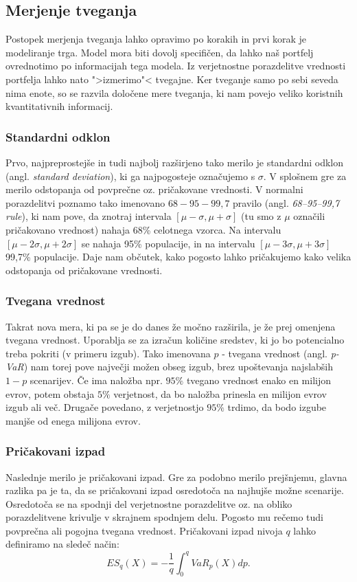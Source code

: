 \documentclass[12pt,a4paper]{amsart}
\theoremstyle{definition} %
\theoremstyle{plain} %
\begin{document}
\subsection{Merjenje tveganja}
Postopek merjenja tveganja lahko opravimo po korakih in prvi korak je modeliranje trga. 
Model mora biti dovolj specifičen, da lahko naš portfelj ovrednotimo po informacijah 
tega modela. Iz verjetnostne porazdelitve vrednosti portfelja lahko nato ">izmerimo"< 
tvegajne. Ker tveganje samo po sebi seveda nima enote, so se razvila določene mere
tveganja, ki nam povejo veliko koristnih kvantitativnih informacij. 

\subsubsection{Standardni odklon}
Prvo, najpreprostejše in tudi najbolj razširjeno tako merilo je standardni odklon (angl. 
\textit{standard deviation}), ki ga najpogosteje označujemo s $\sigma$. V splošnem 
gre za merilo odstopanja od povprečne oz. pričakovane vrednosti. V normalni porazdelitvi 
poznamo tako imenovano $68-95-99,7$ pravilo (angl. \textit{68--95--99,7 rule}), ki nam
pove, da znotraj intervala $[\mu - \sigma, \mu + \sigma]$ (tu smo z $\mu$ označili 
pričakovano vrednost) nahaja 68\% celotnega vzorca. Na intervalu $[\mu - 2\sigma,
\mu + 2\sigma]$ se nahaja 95\% populacije, in na intervalu $[\mu - 3\sigma, \mu + 3\sigma]$
99,7\% populacije. Daje nam občutek, kako pogosto lahko pričakujemo kako velika
odstopanja od pričakovane vrednosti. 

\subsubsection{Tvegana vrednost}
Takrat nova mera, ki pa se je do danes že močno razširila, je že prej omenjena
tvegana vrednost. Uporablja se za izračun količine sredstev, ki jo bo potencialno
treba pokriti (v primeru izgub). Tako imenovana $p$ - tvegana vrednost (angl. \textit{p-VaR}) nam 
torej pove največji možen obseg izgub, brez upoštevanja najslabših $1 - p$  
scenarijev. Če ima naložba npr. $95\%$ tvegano vrednost enako en milijon evrov, 
potem obstaja $5\%$ verjetnost, da bo naložba prinesla en milijon evrov izgub ali več.
Drugače povedano, z verjetnostjo $95\%$ trdimo, da bodo izgube manjše od enega
milijona evrov.

\subsubsection{Pričakovani izpad}
Naslednje merilo je pričakovani izpad. Gre za podobno merilo prejšnjemu, glavna
razlika pa je ta, da se pričakovani izpad osredotoča na najhujše možne scenarije.
Osredotoča se na spodnji del verjetnostne porazdelitve oz. na obliko porazdelitvene
krivulje v skrajnem spodnjem delu. Pogosto mu rečemo tudi povprečna ali pogojna
tvegana vrednost. Pričakovani izpad nivoja $q$ lahko definiramo na sledeč način:
$$ES_q(X) = -\frac{1}{q} \int_0^q VaR_p(X) dp.$$
\end{document}
